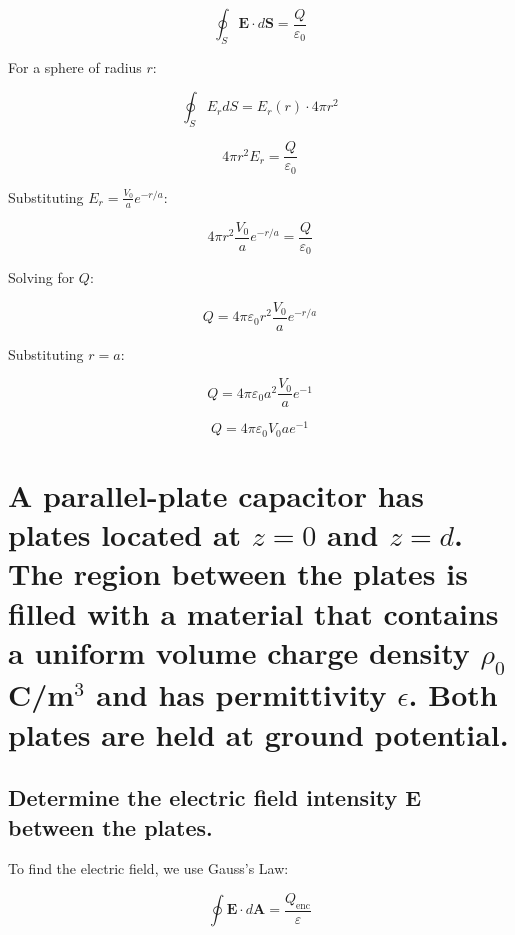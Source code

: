 \documentclass[a4paper,12pt]{article}
\begin{document}
\begin{equation}
\oint_S \mathbf{E} \cdot d\mathbf{S} = \frac{Q}{\varepsilon_0}
\end{equation}

For a sphere of radius \( r \):

\begin{equation}
\oint_S E_r dS = E_r(r) \cdot 4\pi r^2
\end{equation}

\begin{equation}
4\pi r^2 E_r = \frac{Q}{\varepsilon_0}
\end{equation}

Substituting \( E_r = \frac{V_0}{a} e^{-r/a} \):

\begin{equation}
4\pi r^2 \frac{V_0}{a} e^{-r/a} = \frac{Q}{\varepsilon_0}
\end{equation}

Solving for \( Q \):

\begin{equation}
\boxed{Q = 4\pi \varepsilon_0 r^2 \frac{V_0}{a} e^{-r/a}}
\end{equation}

Substituting \( r = a \):

\begin{equation}
Q = 4\pi \varepsilon_0 a^2 \frac{V_0}{a} e^{-1}
\end{equation}

\begin{equation}
\boxed{Q = 4\pi \varepsilon_0 V_0 a e^{-1}}
\end{equation}

\section{A parallel-plate capacitor has plates located at $z = 0$ and $z = d$. The region between the plates is filled with a material that contains a uniform volume charge density $\rho_0$ C/m$^3$ and has permittivity $\epsilon$. Both plates are held at ground potential.}
\subsection{Determine the electric field intensity E between the plates.}
To find the electric field, we use Gauss’s Law:

\begin{equation}
\oint \mathbf{E} \cdot d\mathbf{A} = \frac{Q_{\text{enc}}}{\varepsilon}
\end{equation}
\end{document}
